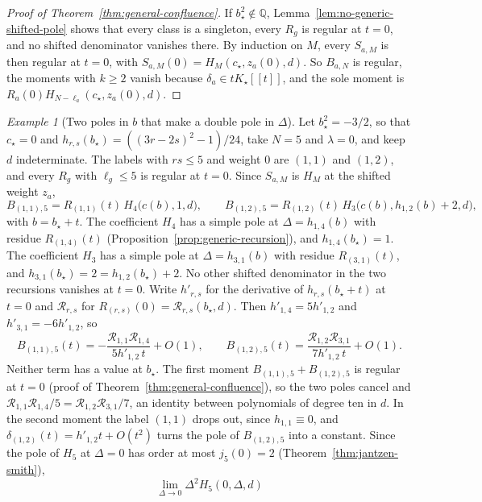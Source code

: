 \documentclass[twoside,10pt]{article}
\numberwithin{equation}{section}
\theoremstyle{slbody}
\theoremstyle{definition}
\theoremstyle{remark}
\newtheorem*{example*}{Example}
\begin{document}
\begin{proof}[Proof of Theorem~\ref{thm:general-confluence}]
If \(b_\star^2\notin\mathbb Q\), Lemma~\ref{lem:no-generic-shifted-pole}
shows that every class is a singleton, every \(R_g\) is regular at \(t=0\), and
no shifted denominator vanishes there.  By induction on \(M\), every
\(S_{a,M}\) is then regular at \(t=0\), with
\(S_{a,M}(0)=H_M(c_\star,z_a(0),d)\).  So \(B_{a,N}\) is regular, the
moments with \(k\geq2\) vanish because \(\delta_a\in tK_\star[[t]]\), and the
sole moment is \(R_a(0)H_{N-\ell_a}(c_\star,z_a(0),d)\).
\end{proof}

\begin{example*}[Two poles in \(b\) that make a double pole in \(\Delta\)]
Let \(b_\star^2=-3/2\), so that \(c_\star=0\) and
\(h_{r,s}(b_\star)=((3r-2s)^2-1)/24\), take \(N=5\) and \(\lambda=0\), and keep
\(d\) indeterminate.  The labels with \(rs\leq5\) and weight \(0\) are \((1,1)\)
and \((1,2)\), and every \(R_g\) with \(\ell_g\leq5\) is regular at \(t=0\).
Since \(S_{a,M}\) is \(H_M\) at the shifted weight \(z_a\),
\[
 B_{(1,1),5}=R_{(1,1)}(t)\,H_4\bigl(c(b),1,d\bigr),\qquad
 B_{(1,2),5}=R_{(1,2)}(t)\,H_3\bigl(c(b),h_{1,2}(b)+2,d\bigr),
\]
with \(b=b_\star+t\).  The coefficient \(H_4\) has a simple pole at
\(\Delta=h_{1,4}(b)\) with residue \(R_{(1,4)}(t)\)
(Proposition~\ref{prop:generic-recursion}), and \(h_{1,4}(b_\star)=1\).  The
coefficient \(H_3\) has a simple pole at \(\Delta=h_{3,1}(b)\) with residue
\(R_{(3,1)}(t)\), and
\(h_{3,1}(b_\star)=2=h_{1,2}(b_\star)+2\).  No other shifted denominator in the
two recursions vanishes at \(t=0\).  Write \(h'_{r,s}\) for the derivative of
\(h_{r,s}(b_\star+t)\) at \(t=0\) and \({\mathcal R}_{r,s}\) for
\(R_{(r,s)}(0)={\mathcal R}_{r,s}(b_\star,d)\).  Then \(h'_{1,4}=5h'_{1,2}\) and
\(h'_{3,1}=-6h'_{1,2}\), so
\[
 B_{(1,1),5}(t)=-\frac{{\mathcal R}_{1,1}{\mathcal R}_{1,4}}{5h'_{1,2}\,t}+O(1),\qquad
 B_{(1,2),5}(t)=\frac{{\mathcal R}_{1,2}{\mathcal R}_{3,1}}{7h'_{1,2}\,t}+O(1).
\]
Neither term has a value at \(b_\star\).  The first moment
\(B_{(1,1),5}+B_{(1,2),5}\) is regular at \(t=0\) (proof of
Theorem~\ref{thm:general-confluence}), so the two poles cancel and
\({\mathcal R}_{1,1}{\mathcal R}_{1,4}/5={\mathcal R}_{1,2}{\mathcal R}_{3,1}/7\), an
identity between polynomials of degree ten in \(d\).  In the second moment the
label \((1,1)\) drops out, since \(h_{1,1}\equiv0\), and
\(\delta_{(1,2)}(t)=h'_{1,2}t+O(t^2)\) turns the pole of \(B_{(1,2),5}\) into a
constant.  Since the pole of \(H_5\) at \(\Delta=0\) has order at most
\(j_5(0)=2\) (Theorem~\ref{thm:jantzen-smith}),
\[
 \lim_{\Delta\to0}\Delta^2H_5(0,\Delta,d)
\]
\end{example*}
\end{document}
